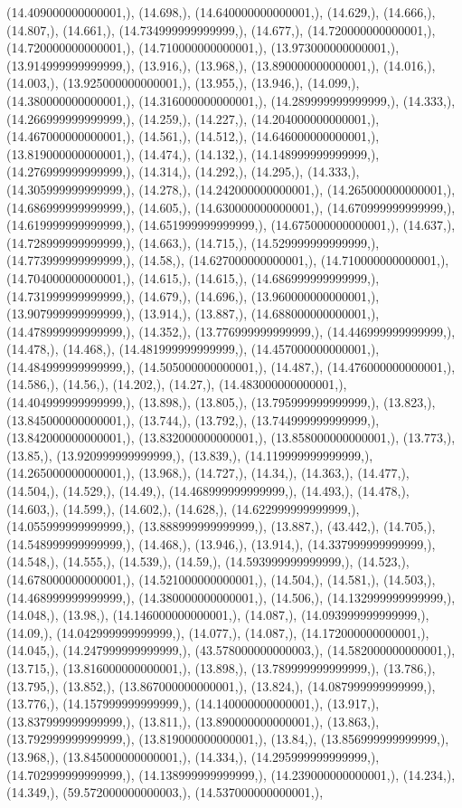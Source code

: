 \documentclass{article}
\begin{document}
(14.409000000000001,), (14.698,), (14.640000000000001,), (14.629,), (14.666,), (14.807,), (14.661,), (14.734999999999999,), (14.677,), (14.720000000000001,), (14.720000000000001,), (14.710000000000001,), (13.973000000000001,), (13.914999999999999,), (13.916,), (13.968,), (13.890000000000001,), (14.016,), (14.003,), (13.925000000000001,), (13.955,), (13.946,), (14.099,), (14.380000000000001,), (14.316000000000001,), (14.289999999999999,), (14.333,), (14.266999999999999,), (14.259,), (14.227,), (14.204000000000001,), (14.467000000000001,), (14.561,), (14.512,), (14.646000000000001,), (13.819000000000001,), (14.474,), (14.132,), (14.148999999999999,), (14.276999999999999,), (14.314,), (14.292,), (14.295,), (14.333,), (14.305999999999999,), (14.278,), (14.242000000000001,), (14.265000000000001,), (14.686999999999999,), (14.605,), (14.630000000000001,), (14.670999999999999,), (14.619999999999999,), (14.651999999999999,), (14.675000000000001,), (14.637,), (14.728999999999999,), (14.663,), (14.715,), (14.529999999999999,), (14.773999999999999,), (14.58,), (14.627000000000001,), (14.710000000000001,), (14.704000000000001,), (14.615,), (14.615,), (14.686999999999999,), (14.731999999999999,), (14.679,), (14.696,), (13.960000000000001,), (13.907999999999999,), (13.914,), (13.887,), (14.688000000000001,), (14.478999999999999,), (14.352,), (13.776999999999999,), (14.446999999999999,), (14.478,), (14.468,), (14.481999999999999,), (14.457000000000001,), (14.484999999999999,), (14.505000000000001,), (14.487,), (14.476000000000001,), (14.586,), (14.56,), (14.202,), (14.27,), (14.483000000000001,), (14.404999999999999,), (13.898,), (13.805,), (13.795999999999999,), (13.823,), (13.845000000000001,), (13.744,), (13.792,), (13.744999999999999,), (13.842000000000001,), (13.832000000000001,), (13.858000000000001,), (13.773,), (13.85,), (13.920999999999999,), (13.839,), (14.119999999999999,), (14.265000000000001,), (13.968,), (14.727,), (14.34,), (14.363,), (14.477,), (14.504,), (14.529,), (14.49,), (14.468999999999999,), (14.493,), (14.478,), (14.603,), (14.599,), (14.602,), (14.628,), (14.622999999999999,), (14.055999999999999,), (13.888999999999999,), (13.887,), (43.442,), (14.705,), (14.548999999999999,), (14.468,), (13.946,), (13.914,), (14.337999999999999,), (14.548,), (14.555,), (14.539,), (14.59,), (14.593999999999999,), (14.523,), (14.678000000000001,), (14.521000000000001,), (14.504,), (14.581,), (14.503,), (14.468999999999999,), (14.380000000000001,), (14.506,), (14.132999999999999,), (14.048,), (13.98,), (14.146000000000001,), (14.087,), (14.093999999999999,), (14.09,), (14.042999999999999,), (14.077,), (14.087,), (14.172000000000001,), (14.045,), (14.247999999999999,), (43.578000000000003,), (14.582000000000001,), (13.715,), (13.816000000000001,), (13.898,), (13.789999999999999,), (13.786,), (13.795,), (13.852,), (13.867000000000001,), (13.824,), (14.087999999999999,), (13.776,), (14.157999999999999,), (14.140000000000001,), (13.917,), (13.837999999999999,), (13.811,), (13.890000000000001,), (13.863,), (13.792999999999999,), (13.819000000000001,), (13.84,), (13.856999999999999,), (13.968,), (13.845000000000001,), (14.334,), (14.295999999999999,), (14.702999999999999,), (14.138999999999999,), (14.239000000000001,), (14.234,), (14.349,), (59.572000000000003,), (14.537000000000001,), 
\end{document}
